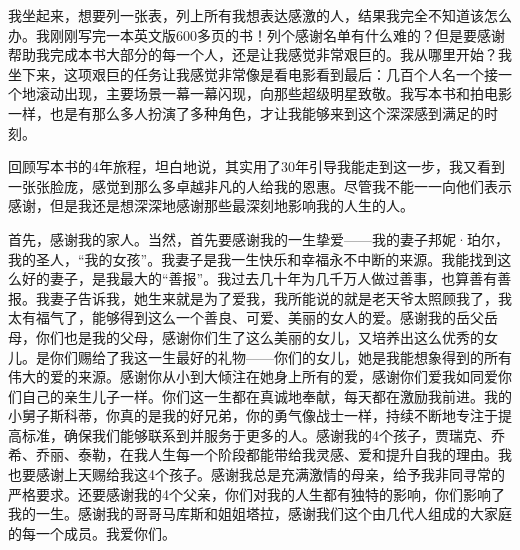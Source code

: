 

我坐起来，想要列一张表，列上所有我想表达感激的人，结果我完全不知道该怎么办。我刚刚写完一本英文版600多页的书！列个感谢名单有什么难的？但是要感谢帮助我完成本书大部分的每一个人，还是让我感觉非常艰巨的。我从哪里开始？我坐下来，这项艰巨的任务让我感觉非常像是看电影看到最后：几百个人名一个接一个地滚动出现，主要场景一幕一幕闪现，向那些超级明星致敬。我写本书和拍电影一样，也是有那么多人扮演了多种角色，才让我能够来到这个深深感到满足的时刻。

回顾写本书的4年旅程，坦白地说，其实用了30年引导我能走到这一步，我又看到一张张脸庞，感觉到那么多卓越非凡的人给我的恩惠。尽管我不能一一向他们表示感谢，但是我还是想深深地感谢那些最深刻地影响我的人生的人。

首先，感谢我的家人。当然，首先要感谢我的一生挚爱——我的妻子邦妮·珀尔，我的圣人，“我的女孩”。我妻子是我一生快乐和幸福永不中断的来源。我能找到这么好的妻子，是我最大的“善报”。我过去几十年为几千万人做过善事，也算善有善报。我妻子告诉我，她生来就是为了爱我，我所能说的就是老天爷太照顾我了，我太有福气了，能够得到这么一个善良、可爱、美丽的女人的爱。感谢我的岳父岳母，你们也是我的父母，感谢你们生了这么美丽的女儿，又培养出这么优秀的女儿。是你们赐给了我这一生最好的礼物——你们的女儿，她是我能想象得到的所有伟大的爱的来源。感谢你从小到大倾注在她身上所有的爱，感谢你们爱我如同爱你们自己的亲生儿子一样。你们这一生都在真诚地奉献，每天都在激励我前进。我的小舅子斯科蒂，你真的是我的好兄弟，你的勇气像战士一样，持续不断地专注于提高标准，确保我们能够联系到并服务于更多的人。感谢我的4个孩子，贾瑞克、乔希、乔丽、泰勒，在我人生每一个阶段都能带给我灵感、爱和提升自我的理由。我也要感谢上天赐给我这4个孩子。感谢我总是充满激情的母亲，给予我非同寻常的严格要求。还要感谢我的4个父亲，你们对我的人生都有独特的影响，你们影响了我的一生。感谢我的哥哥马库斯和姐姐塔拉，感谢我们这个由几代人组成的大家庭的每一个成员。我爱你们。

